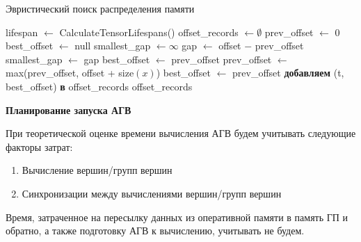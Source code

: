 \begin{algorithm}
    \caption{Эвристический поиск распределения памяти}
    \label{alg:euristic_search}
    \begin{algorithmic}[1]
            \State lifespan $\gets$ CalculateTensorLifespans()
            \State offset\_records $\gets \emptyset$ 
                \State prev\_offset $\gets$ 0
                \State best\_offset $\gets$ null
                \State smallest\_gap $\gets \infty$
                            \State gap $\gets$ offset $-$ prev\_offset
                                \State smallest\_gap $\gets$ gap
                                \State best\_offset $\gets$ prev\_offset
                            \EndIf
                        \EndIf
                        \State prev\_offset $\gets$ max(prev\_offset, offset + size$(x)$)
                    \EndIf
                \EndFor
                    \State best\_offset $\gets$ prev\_offset
                \EndIf
                \State \textbf{добавляем} (t, best\_offset) \textbf{в} offset\_records
            \EndFor
            \State \Return offset\_records
        \EndFunction
    \end{algorithmic}
\end{algorithm}
\newpage
\noindent\textbf{Планирование запуска АГВ}

При теоретической оценке времени вычисления АГВ будем учитывать следующие
факторы затрат:
\begin{enumerate}
    \item Вычисление вершин/групп вершин
    \item Синхронизации между вычислениями вершин/групп вершин
\end{enumerate}

Время, затраченное на пересылку данных из оперативной памяти в память ГП и
обратно, а также подготовку АГВ к вычислению, учитывать не будем.

